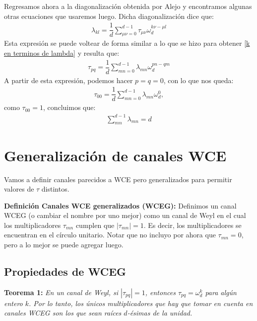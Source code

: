 Regresamos ahora a la diagonalización obtenida por Alejo  y encontramos algunas otras ecuaciones que usaremos luego. Dicha diagonalización dice que:
\begin{align*}
\lambda_{kl} = \dfrac{1}{d} \sum_{\mu \nu = 0}^{d-1} \tau_{\mu \nu} \omega_d^{k \nu - \mu l}
\end{align*}
Esta expresión se puede voltear de forma similar a lo que se hizo para obtener \ref{k en terminos de lambda} y resulta que:
\begin{align}
\label{tau en termino de lambda}
\tau_{pq} = \dfrac{1}{d} \sum_{mn=0}^{d-1} \lambda_{mn} \omega_d^{pn-qm}
\end{align}
A partir de esta expresión, podemos hacer $p=q=0$, con lo que nos queda:
\begin{align*}
\tau_{00} = \dfrac{1}{d} \sum_{mn=0}^{d-1} \lambda_{mn} \omega_d^0,
\end{align*}
como $\tau_{00}=1$, concluimos que:
\begin{align}
\label{suma-lambdas}
\sum_{mn}^{d-1}\lambda_{mn} = d
\end{align}

\section{Generalización de canales WCE} %

Vamos a definir canales parecidos a WCE pero generalizados para permitir
valores de $\tau$ distintos. 

\textbf{Definición Canales WCE generalizados (WCEG):} Definimos un canal WCEG
(o cambiar el nombre por uno mejor) como un canal de Weyl en el cual los
multiplicadores $\tau_{mn}$ cumplen que $|\tau_{mn}|= 1$.  Es decir, los
multiplicadores se encuentran en el círculo unitario. Notar que no incluyo por
ahora que $\tau_{mn} = 0$, pero a lo mejor se puede agregar luego. 





\subsection{Propiedades de WCEG}



\textbf{Teorema 1:} \textit{En un canal de Weyl, si $|\tau_{pq}| = 1$, entonces $\tau_{pq} = \omega_d^{k}$ para algún entero $k$. Por lo tanto, los únicos multiplicadores que hay que tomar en cuenta en canales WCEG son los que sean raíces $d$-ésimas de la unidad.} \\

